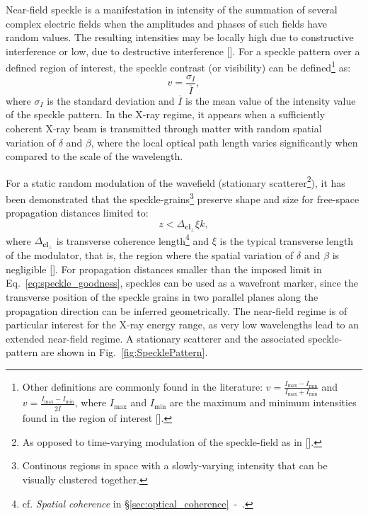 \begin{refsection}
Near-field speckle is a manifestation in intensity of the summation of several complex electric fields when the amplitudes and phases of such fields have random values. The resulting intensities may be locally high due to constructive interference or low, due to destructive interference [\cite[\textit{\S1}]{Goodman2020}]. For a speckle pattern over a defined region of interest, the speckle contrast (or visibility) can be defined\footnote{Other definitions are commonly found in the literature: $v=\frac{I_\text{max}-I_\text{min}}{I_\text{max}+I_\text{min}}$ and $v=\frac{I_\text{max}-I_\text{min}}{2\overline{I}}$, where $I_\text{max}$ and $I_\text{min}$ are the maximum and minimum intensities found in the region of interest [\cite{Zdora2018a}].} as:
\begin{equation}\label{eq:visibility}
    v=\frac{\sigma_I}{\overline{I}},
\end{equation}
where $\sigma_I$ is the standard deviation and $\overline{I}$ is the mean value of the intensity value of the speckle pattern. In the X-ray regime, it appears when a sufficiently coherent X-ray beam is transmitted through matter with random spatial variation of $\delta$ and $\beta$, where the local optical path length varies significantly when compared to the scale of the wavelength.

For a static random modulation of the wavefield (stationary scatterer\footnote{As opposed to time-varying modulation of the speckle-field as in [\cite{Morgan2010,Goikhman2015}].}), it has been demonstrated that the speckle-grains\footnote{Continous regions in space with a slowly-varying intensity that can be visually clustered together.} preserve shape and size for free-space propagation distances limited to:
\begin{equation}\label{eq:speckle_goodness}
z<\Delta_{\textbf{cl}_\perp}\xi k,
\end{equation}
where $\Delta_{\textbf{cl}_\perp}$ is transverse coherence length\footnote{cf. \textit{Spatial coherence} in \S\ref{sec:optical_coherence}~-~\textit{}.} and $\xi$ is the typical transverse length of the modulator, that is, the region where the spatial variation of $\delta$ and $\beta$ is negligible [\cite{Cerbino2008}]. For propagation distances smaller than the imposed limit in Eq.~\ref{eq:speckle_goodness}, speckles can be used as a wavefront marker, since the transverse position of the speckle grains in two parallel planes along the propagation direction can be inferred geometrically. The near-field regime is of particular interest for the X-ray energy range, as very low wavelengths lead to an extended near-field regime. A stationary scatterer and the associated speckle-pattern are shown in Fig.~\ref{fig:SpecklePattern}.


\end{refsection}
